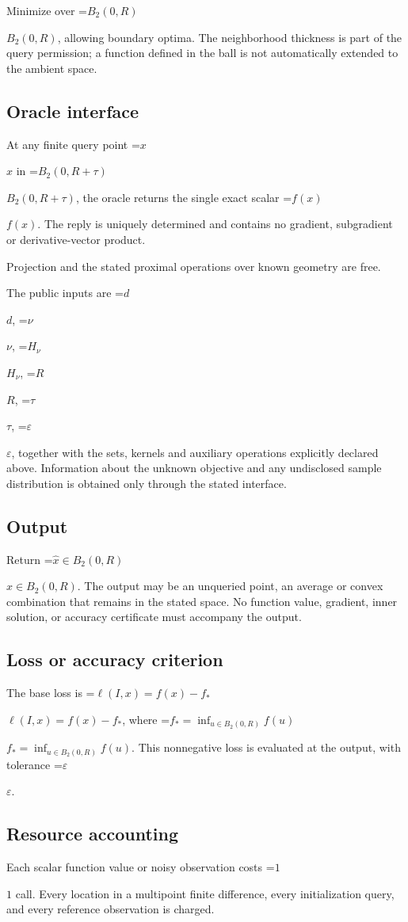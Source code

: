 \documentclass[10pt,a4paper]{article}
\newcommand{\AtlasMath}[1]{\par\begingroup\centering\setbox0=\hbox{$\displaystyle #1$}\ifdim\wd0>1.4\linewidth\typeout{ATLAS WIDE FORMULA: \the\wd0}\fi\ifdim\wd0>\linewidth\resizebox{\linewidth}{!}{\box0}\else\box0\fi\par\endgroup}
\newcommand{\AtlasInlineMath}[1]{\begingroup\setbox0=\hbox{$#1$}\ifdim\wd0>.4\linewidth\endgroup\AtlasMath{#1}\else\endgroup$#1$\fi}
\begin{document}
Minimize over \AtlasInlineMath{B_2(0,R)}, allowing boundary optima. The neighborhood thickness is part of the query permission; a function defined in the ball is not automatically extended to the ambient space.

\subsection{Oracle interface}
At any finite query point \AtlasInlineMath{x} in \AtlasInlineMath{B_2(0,R+\tau)}, the oracle returns the single exact scalar \AtlasInlineMath{f(x)}. The reply is uniquely determined and contains no gradient, subgradient or derivative-vector product.

Projection and the stated proximal operations over known geometry are free.

The public inputs are \AtlasInlineMath{d}, \AtlasInlineMath{\nu}, \AtlasInlineMath{H_\nu}, \AtlasInlineMath{R}, \AtlasInlineMath{\tau}, \AtlasInlineMath{\varepsilon}, together with the sets, kernels and auxiliary operations explicitly declared above. Information about the unknown objective and any undisclosed sample distribution is obtained only through the stated interface.

\subsection{Output}
Return \AtlasInlineMath{\widehat{x}\in B_2(0,R)}. The output may be an unqueried point, an average or convex combination that remains in the stated space. No function value, gradient, inner solution, or accuracy certificate must accompany the output.

\subsection{Loss or accuracy criterion}
The base loss is \AtlasInlineMath{\ell(I,x)=f(x)-f_*}, where \AtlasInlineMath{f_*=\inf_{u\in B_2(0,R)}f(u)}. This nonnegative loss is evaluated at the output, with tolerance \AtlasInlineMath{\varepsilon}.

\subsection{Resource accounting}
Each scalar function value or noisy observation costs \AtlasInlineMath{1} call. Every location in a multipoint finite difference, every initialization query, and every reference observation is charged.
\end{document}
